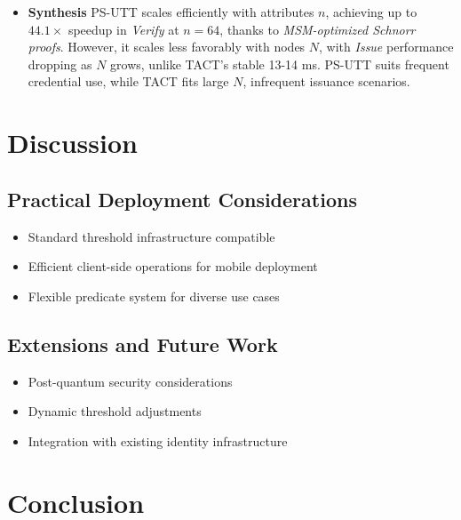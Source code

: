 \begin{itemize}
    \item \textbf{Synthesis}
    PS-UTT scales efficiently with attributes $n$, achieving up to $44.1\times$ speedup in \textit{Verify} at $n = 64$, thanks to \textit{MSM-optimized Schnorr proofs}. However, it scales less favorably with nodes $N$, with \textit{Issue} performance dropping as $N$ grows, unlike TACT’s stable 13-14 ms. PS-UTT suits frequent credential use, while TACT fits large $N$, infrequent issuance scenarios.

\end{itemize}












\section{Discussion}
\label{sec:threshold-discussion}

\subsection{Practical Deployment Considerations}
\begin{itemize}
    \item Standard threshold infrastructure compatible
    \item Efficient client-side operations for mobile deployment
    \item Flexible predicate system for diverse use cases
\end{itemize}

\subsection{Extensions and Future Work}
\begin{itemize}
    \item Post-quantum security considerations
    \item Dynamic threshold adjustments
    \item Integration with existing identity infrastructure
\end{itemize}

\section{Conclusion}
\label{sec:threshold-conclusion}

